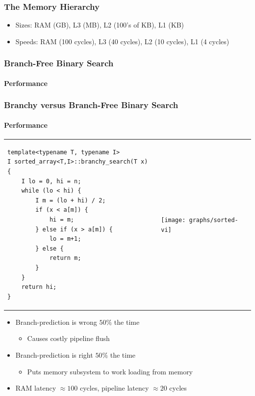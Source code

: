 \documentclass[xcolor=dvipsnames]{beamer}
\begin{document}
\begin{frame}
   \frametitle{The Memory Hierarchy}

   \begin{center}
   \end{center}
   \begin{itemize}
     \item<+->Sizes: RAM (GB), L3 (MB), L2 (100's of KB), L1 (KB)
     \item<+->Speeds: RAM (100 cycles), L3 (40 cycles), L2 (10 cycles), L1 (4 cycles)
   \end{itemize}
   
\end{frame}

\begin{frame}
   \frametitle{Branch-Free Binary Search}
   \framesubtitle{Performance}

   \begin{center}
   \end{center}
\end{frame}

\begin{frame}[fragile]
   \frametitle{Branchy versus Branch-Free Binary Search}
   \framesubtitle{Performance}

   \begin{tabular}{m{}m{}}
\tiny
 \begin{verbatim}
template<typename T, typename I>
I sorted_array<T,I>::branchy_search(T x) {
    I lo = 0, hi = n;
    while (lo < hi) {
        I m = (lo + hi) / 2;
        if (x < a[m]) {
            hi = m;
        } else if (x > a[m]) {
            lo = m+1;
        } else {
            return m;
        }
    }
    return hi;
}
\end{verbatim}
&
     \texttt{[image: graphs/sorted-vi]}
\end{tabular}
\begin{itemize}
  \item<+-> Branch-prediction is wrong $50\%$ the time
     \begin{itemize}
       \item<+-> Causes costly pipeline flush
     \end{itemize}
  \item<+-> Branch-prediction is right $50\%$ the time
      \begin{itemize}
       \item<+-> Puts memory subsystem to work loading from memory
     \end{itemize}
  \item<+->RAM latency $\approx100$ cycles, pipeline latency $\approx 20$ cycles
\end{itemize}
\end{frame}
\end{document}
